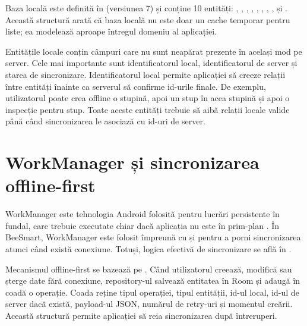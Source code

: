 Baza locală este definită în  (versiunea 7) și conține 10 entități: , , , , , , , ,  și . Această structură arată că baza locală nu este doar un cache temporar pentru liste; ea modelează aproape întregul domeniu al aplicației.

Entitățile locale conțin câmpuri care nu sunt neapărat prezente în același mod pe server. Cele mai importante sunt identificatorul local, identificatorul de server și starea de sincronizare. Identificatorul local permite aplicației să creeze relații între entități înainte ca serverul să confirme id-urile finale. De exemplu, utilizatorul poate crea offline o stupină, apoi un stup în acea stupină și apoi o inspecție pentru stup. Toate aceste entități trebuie să aibă relații locale valide până când sincronizarea le asociază cu id-uri de server.

\section{WorkManager și sincronizarea offline-first}

WorkManager este tehnologia Android folosită pentru lucrări persistente în fundal, care trebuie executate chiar dacă aplicația nu este în prim-plan \cite{androidWorkManagerDocs}. În BeeSmart, WorkManager este folosit împreună cu  și  pentru a porni sincronizarea atunci când există conexiune. Totuși, logica efectivă de sincronizare se află în .

Mecanismul offline-first se bazează pe . Când utilizatorul creează, modifică sau șterge date fără conexiune, repository-ul salvează entitatea în Room și adaugă în coadă o operație. Coada reține tipul operației, tipul entității, id-ul local, id-ul de server dacă există, payload-ul JSON, numărul de retry-uri și momentul creării. Această structură permite aplicației să reia sincronizarea după întreruperi.

